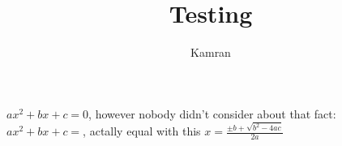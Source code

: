 \documentclass{report}
\title{Testing}
\author{Kamran}
\date{}
\begin{document}
$ax^2+bx+c=0$, however nobody didn't consider about that fact: $ax^2+bx+c=$, actally equal with this $x = \frac{\pm b+\sqrt{b^2-4ac}}{2a}$
\end{document}
